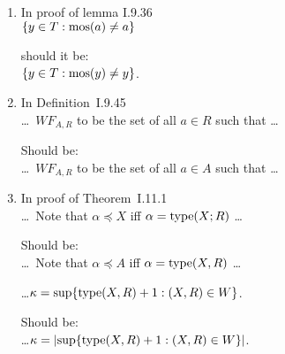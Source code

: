 \begin{enumerate}

\item
In proof of lemma I.9.36\\
\(\{y \in T: {\rm mos}(a) \neq a\}\)

should it be:\\
\(\{y \in T: {\rm mos}(y) \neq y\}\).

\item
In Definition~I.9.45 \\
\ldots\ \(WF_{A,R}\) to be the set of all \(a \in R\) such that \ldots

Should be:\\
\ldots\ \(WF_{A,R}\) to be the set of all \(a \in A\) such that \ldots

\item In proof of Theorem~I.11.1 \\
\ldots\ Note that \(\alpha \preccurlyeq X\) iff \(\alpha = \mathop{\mathrm{type}}(X;R)\) \ldots

Should be:\\
\ldots\ Note that \(\alpha \preccurlyeq A\) iff \(\alpha = \mathop{\mathrm{type}}(X,R)\) \ldots

\ldots \(\kappa = \sup\{\mathop{\mathrm{type}}(X, R) + 1 : (X, R) \in W\}\).

Should be:\\
\ldots \(\kappa = \left|\sup\{\mathop{\mathrm{type}}(X, R) + 1 : (X, R) \in W\}\right|\).

\end{enumerate}



\iftrue
 
\else
\fi


% 



\printindex



